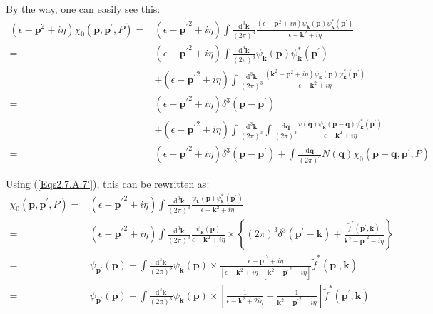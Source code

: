 By the way, one can easily see this:
\[ \begin{split}
(\epsilon-\mathbf{p}^2+i\eta)\chi_0(\mathbf{p},\mathbf{p}^{'},P) =& (\epsilon-{\mathbf{p}^{'}}^2+i\eta)\int \frac{\mathrm{d}^3 \mathbf{k}}{(2\pi)^3}\frac{(\epsilon-\mathbf{p}^2+i\eta)\psi_{\mathbf{k}}(\mathbf{p})\psi_{\mathbf{k}}^{*}(\mathbf{p}^{'})}{\epsilon-\mathbf{k}^2+i\eta}\\
=&(\epsilon-{\mathbf{p}^{'}}^2+i\eta)\int \frac{\mathrm{d}^3 \mathbf{k}}{(2\pi)^3}\psi_{\mathbf{k}}(\mathbf{p})\psi_{\mathbf{k}}^{*}(\mathbf{p}^{'})\\
&+(\epsilon-{\mathbf{p}^{'}}^2+i\eta)\int \frac{\mathrm{d}^3 \mathbf{k}}{(2\pi)^3}\frac{(\mathbf{k}^2-\mathbf{p}^2+i \eta)\psi_{\mathbf{k}}(\mathbf{p})\psi_{\mathbf{k}}^{*}(\mathbf{p}^{'})}{\epsilon-\mathbf{k}^2+i\eta}\\
=&(\epsilon-{\mathbf{p}^{'}}^2+i\eta)\delta^3(\mathbf{p}-\mathbf{p}^{'})\\
&+(\epsilon-{\mathbf{p}^{'}}^2+i\eta)\int \frac{\mathrm{d}^3 \mathbf{k}}{(2\pi)^3}\int \frac{\mathrm{d} \mathbf{q}}{(2\pi)^3} \frac{v(\mathbf{q})\psi_{\mathbf{k}}(\mathbf{p}-\mathbf{q})\psi_{\mathbf{k}}^{*}(\mathbf{p}^{'})}{\epsilon - \mathbf{k}^2+i \eta}\\
=&(\epsilon-{\mathbf{p}^{'}}^2+i\eta)\delta^3(\mathbf{p}-\mathbf{p}^{'})+\int \frac{\mathrm{d} \mathbf{q}}{(2\pi)^3} N(\mathbf{q}) \chi_0(\mathbf{p}-\mathbf{q},\mathbf{p}^{'},P)
\end{split} \]

Using (\ref{Eqs2.7.A.7'}), this can be rewritten as:
\begin{equation} \label{Eqs2.7.22} \begin{split}
\chi_0(\mathbf{p},\mathbf{p}^{'},P) =& (\epsilon-{\mathbf{p}^{'}}^2+i\eta)\int \frac{\mathrm{d}^3 \mathbf{k}}{(2\pi)^3}\frac{\psi_{\mathbf{k}}(\mathbf{p})\psi_{\mathbf{k}}^{*}(\mathbf{p}^{'})}{\epsilon-\mathbf{k}^2+i \eta}\\
=&(\epsilon-{\mathbf{p}^{'}}^2+i\eta)\int \frac{\mathrm{d}^3 \mathbf{k}}{(2\pi)^3}\frac{\psi_{\mathbf{k}}(\mathbf{p})}{\epsilon-\mathbf{k}^2+i \eta} \times \left\{ (2\pi)^3\delta^3(\mathbf{p}^{'}-\mathbf{k})+\frac{\tilde{f}^{*}(\mathbf{p}^{'},\mathbf{k})}{\mathbf{k}^2-{\mathbf{p}^{'}}^2-i \eta} \right\}\\
=&\psi_{\mathbf{p}^{'}}(\mathbf{p}) + \int \frac{\mathrm{d}^3 \mathbf{k}}{(2\pi)^3} \psi_{\mathbf{k}}(\mathbf{p}) \times \frac{\epsilon-{\mathbf{p}^{'}}^2+i \eta}{[\epsilon-\mathbf{k}^2+i \eta][\mathbf{k}^2-{\mathbf{p}^{'}}^2-i \eta]}\tilde{f}^{*}(\mathbf{p}^{'},\mathbf{k})\\
=&\psi_{\mathbf{p}^{'}}(\mathbf{p}) + \int \frac{\mathrm{d}^3 \mathbf{k}}{(2\pi)^3} \psi_{\mathbf{k}}(\mathbf{p}) \times \left[ \frac{1}{\epsilon-\mathbf{k}^2+2i \eta} + \frac{1}{\mathbf{k}^2-{\mathbf{p}^{'}}^2-i \eta} \right]\tilde{f}^{*}(\mathbf{p}^{'},\mathbf{k})
\end{split} \end{equation}

